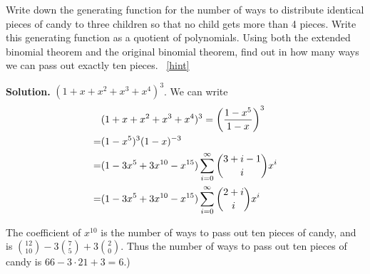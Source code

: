 \documentclass{book}
\begin{document}
\setcounter{project}{255}
\addtocounter{project}{-1}
\begin{activity}[]\label{candygenfn}
\hypertarget{p-1388}{}%
Write down the generating function for the number of ways to distribute identical pieces of candy to three children so that no child gets more than 4 pieces. Write this generating function as a quotient of polynomials. Using both the extended binomial theorem and the original binomial theorem, find out in how many ways we can pass out exactly ten pieces.%
~\hfill{\tiny\hyperlink{a-255}{[hint]}\hypertarget{q-255}{}}\par\smallskip%
\noindent\textbf{Solution.}\hypertarget{solution-191}{}\quad%
\hypertarget{p-1391}{}%
\((1+x+x^2+x^3+x^4)^3\). We can write%
\begin{align*}
& (1+x+x^2+x^3+x^4)^3 = \left(\frac{1-x^5}{1-x}\right)^3\\
=& (1-x^5)^3(1-x)^{-3}\\
=& (1-3x^5+3x^{10}-x^{15})\sum_{i=0}^\infty \binom{3+i-1}{i}x^i\\
=& (1-3x^5+3x^{10}-x^{15})\sum_{i=0}^\infty \binom{2+i}{i}x^i
\end{align*}
%
\par
\hypertarget{p-1392}{}%
The coefficient of \(x^{10}\) is the number of ways to pass out ten pieces of candy, and is \(\binom{12}{10}-3\binom{7}{5} +3\binom{2}{0}\).  Thus the number of ways to pass out ten pieces of candy is \(66-3\cdot21+3=6\).)%
\end{activity}
\end{document}
